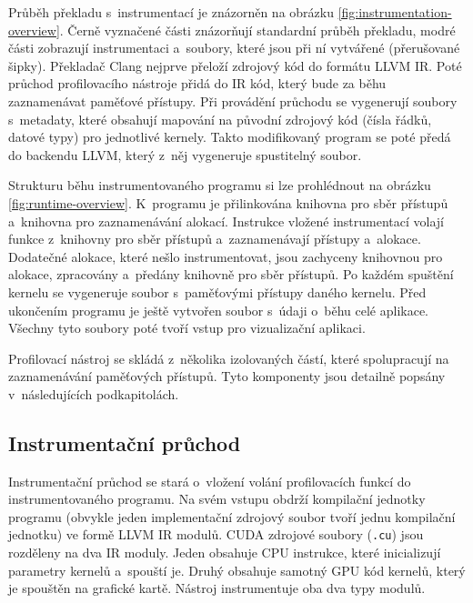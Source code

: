 Průběh překladu s~instrumentací je znázorněn na obrázku \ref{fig:instrumentation-overview}. Černě vyznačené části znázorňují standardní průběh překladu, modré části zobrazují instrumentaci a~soubory, které jsou při ní vytvářené (přerušované šipky).
Překladač Clang nejprve přeloží zdrojový kód do formátu LLVM IR. Poté průchod profilovacího nástroje přidá do IR kód, který bude za běhu zaznamenávat paměťové přístupy. Při provádění průchodu se vygenerují soubory s~metadaty, které obsahují mapování na původní zdrojový kód (čísla řádků, datové typy) pro jednotlivé kernely. Takto modifikovaný program se poté předá do backendu LLVM, který z~něj vygeneruje spustitelný soubor.

Strukturu běhu instrumentovaného programu si lze prohlédnout na obrázku \ref{fig:runtime-overview}. K~programu je přilinkována knihovna pro sběr přístupů a~knihovna pro zaznamenávání alokací. Instrukce vložené instrumentací volají funkce z~knihovny pro sběr přístupů a~zaznamenávají přístupy a~alokace. Dodatečné alokace, které nešlo instrumentovat, jsou zachyceny knihovnou pro alokace, zpracovány a~předány knihovně pro sběr přístupů.
Po každém spuštění kernelu se vygeneruje soubor s~paměťovými přístupy daného kernelu. Před ukončením programu je ještě vytvořen soubor s~údaji o~běhu celé aplikace. Všechny tyto soubory poté tvoří vstup pro vizualizační aplikaci.



Profilovací nástroj se skládá z~několika izolovaných částí, které spolupracují na zaznamenávání paměťových přístupů. Tyto komponenty jsou detailně popsány v~následujících podkapitolách.

\subsection{Instrumentační průchod}
\label{sec:pass}
Instrumentační průchod se stará o~vložení volání profilovacích funkcí do instrumentovaného programu. Na svém vstupu obdrží kompilační jednotky programu (obvykle jeden implementační zdrojový soubor tvoří jednu kompilační jednotku) ve formě LLVM IR modulů. CUDA zdrojové soubory (\texttt{.cu}) jsou rozděleny na dva IR moduly. Jeden obsahuje CPU instrukce, které inicializují parametry kernelů a~spouští je. Druhý obsahuje samotný GPU kód kernelů, který je spouštěn na grafické kartě. Nástroj instrumentuje oba dva typy modulů.

